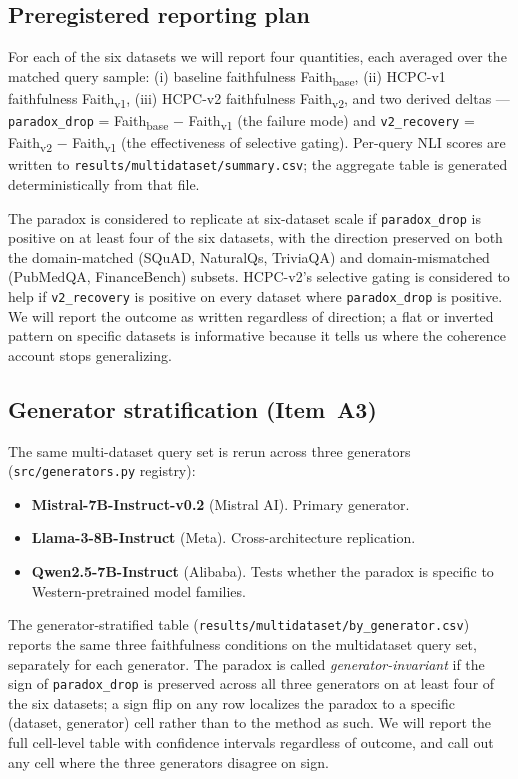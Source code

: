 \subsection{Preregistered reporting plan}
\label{sec:multidataset_plan}

For each of the six datasets we will report four quantities, each
averaged over the matched query sample: (i) baseline faithfulness
Faith\textsubscript{base}, (ii) HCPC-v1 faithfulness
Faith\textsubscript{v1}, (iii) HCPC-v2 faithfulness
Faith\textsubscript{v2}, and two derived deltas —
\texttt{paradox\_drop} =
Faith\textsubscript{base} $-$ Faith\textsubscript{v1} (the failure mode)
and \texttt{v2\_recovery} =
Faith\textsubscript{v2} $-$ Faith\textsubscript{v1} (the effectiveness
of selective gating). Per-query NLI scores are written to
\texttt{results/multidataset/summary.csv}; the aggregate table is
generated deterministically from that file.

The paradox is considered to replicate at six-dataset scale if
\texttt{paradox\_drop} is positive on at least four of the six datasets,
with the direction preserved on both the domain-matched (SQuAD,
NaturalQs, TriviaQA) and domain-mismatched (PubMedQA, FinanceBench)
subsets. HCPC-v2's selective gating is considered to help if
\texttt{v2\_recovery} is positive on every dataset where
\texttt{paradox\_drop} is positive. We will report the outcome as
written regardless of direction; a flat or inverted pattern on specific
datasets is informative because it tells us where the coherence account
stops generalizing.

\subsection{Generator stratification (Item~A3)}

The same multi-dataset query set is rerun across three generators
(\texttt{src/generators.py} registry):

\begin{itemize}
  \item \textbf{Mistral-7B-Instruct-v0.2} (Mistral AI). Primary generator.
  \item \textbf{Llama-3-8B-Instruct} (Meta). Cross-architecture replication.
  \item \textbf{Qwen2.5-7B-Instruct} (Alibaba). Tests whether the paradox
        is specific to Western-pretrained model families.
\end{itemize}

The generator-stratified table
(\texttt{results/multidataset/by\_generator.csv}) reports the same three
faithfulness conditions on the multidataset query set, separately for
each generator. The paradox is called \emph{generator-invariant} if the
sign of \texttt{paradox\_drop} is preserved across all three generators
on at least four of the six datasets; a sign flip on any row localizes
the paradox to a specific (dataset, generator) cell rather than to the
method as such. We will report the full cell-level table with confidence
intervals regardless of outcome, and call out any cell where the three
generators disagree on sign.

